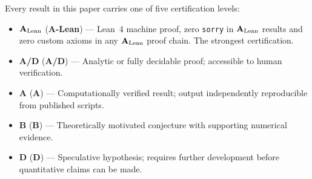 \documentclass[11pt]{article}
\theoremstyle{remark}
\newcommand{\CatA}{\textbf{A}}
\newcommand{\CatAL}{\texorpdfstring{\ensuremath{\textbf{A}_{\rm Lean}}}{A-Lean}}
\newcommand{\CatAD}{\textbf{A/D}}
\newcommand{\CatB}{\textbf{B}}
\newcommand{\CatD}{\textbf{D}}
\begin{document}
\tableofcontents
\newpage

\begin{tcolorbox}[
  colback=gray!8,colframe=gray!50,title=Claim-Strength Taxonomy,
  fonttitle=\bfseries,breakable]
\small
Every result in this paper carries one of five certification levels:
\begin{itemize}[leftmargin=1.8em,itemsep=2pt,topsep=2pt]
  \item \CatAL{} (\textbf{A-Lean}) --- Lean~4 machine proof, zero \texttt{sorry}
        in \CatAL{} results and zero custom axioms in any \CatAL{} proof chain.
        The strongest certification.
  \item \CatAD{} (\textbf{A/D}) --- Analytic or fully decidable proof;
        accessible to human verification.
  \item \CatA{} (\textbf{A}) --- Computationally verified result; output
        independently reproducible from published scripts.
  \item \CatB{} (\textbf{B}) --- Theoretically motivated conjecture with
        supporting numerical evidence.
  \item \CatD{} (\textbf{D}) --- Speculative hypothesis; requires further
        development before quantitative claims can be made.
\end{itemize}
\end{tcolorbox}
\end{document}
